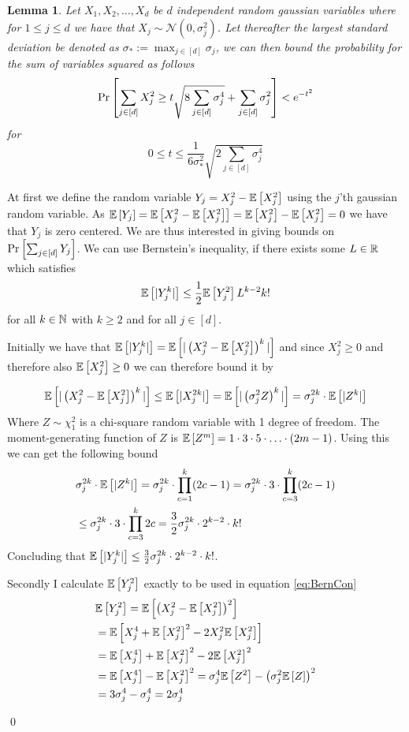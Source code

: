 \documentclass[a4paper,12pt]{article}
\renewenvironment{proof}{{\textit{Proof} \\}}{\qed}
\newtheorem{lemma}{Lemma}[section]
\begin{document}
\begin{lemma}
\label{lem:Bernstein}
Let $X_1, X_2, \dots , X_d$ be $d$ independent random gaussian variables 
where for $ 1 \le j \le d$ we have that $X_j \sim \mathcal{N}(0, \sigma_j^2)$.
Let thereafter the largest standard deviation be denoted as $\sigma_* := \max_{j \in [d]} \sigma_j$,
we can then bound the probability for the sum of variables squared as follows 
\[
\Pr\left [\sum_{j \in [d]} X_j^2  \ge 
    t \sqrt{8 \sum_{j \in [d]} \sigma_j^4} +
    \sum_{j \in [d]} \sigma_j^2  \right] < e^{-t^2}
\]
for
\[
0 \le t \le 
    \frac{1}{6 \sigma_*^2} \sqrt{2 \sum_{j \in [d]} \sigma_j^4}
\]
\end{lemma}
\begin{proof}
At first we define the random variable $Y_j = X_j^2 - \mathbb{E} \left [ X_j^2  \right]$ 
using the $j$'th gaussian random variable.
As $\mathbb{E} \left [ Y_j  \right] = \mathbb{E} \left [ X_j^2 - \mathbb{E} \left [ X_j^2  \right]  \right] = \mathbb{E} \left [ X_j^2  \right] - \mathbb{E} \left [ X_j^2  \right] = 0$ 
we have that $Y_j$ is zero centered. We are thus interested in giving bounds on
$\Pr\left [\sum_{j \in [d]} Y_j \right]$. 
We can use Bernstein's inequality, if there exists some $L \in \mathbb{R}$ which satisfies 
\begin{equation}
\label{eq:BernCon}
    \mathbb{E} \left [  |Y^k_j|   \right] \le \frac{1}{2} \mathbb{E} \left [ Y_j^2  \right] L^{k-2} k!
\end{equation}
for all $k \in \mathbb{N}$ with $k \ge 2$ and for all $j \in [d]$. \cite{wainwright_2019}

Initially we have that $\mathbb{E} \left [  |Y_j^k|   \right] = \mathbb{E} \left [  |\left (X_j^2 - \mathbb{E} \left [ X_j^2  \right]\right)^k|  \right]$
and since $X_j^2 \ge 0$ and therefore also $\mathbb{E} \left [ X_j^2  \right] \ge 0$ 
we can therefore bound it by

\[
    \mathbb{E} \left [  |\left (X_j^2 - \mathbb{E} \left [ X_j^2  \right]\right)^k|  \right] \le \mathbb{E} \left [  | X_j^{2k} |   \right] =
    \mathbb{E} \left [  | \left (\sigma_j^2 Z\right)^{k} |   \right] = 
    \sigma_j^{2k} \cdot \mathbb{E} \left [  |Z^{k} |   \right]
\]
Where $Z \sim \chi^2_1$ is a chi-square random variable with 1 degree of freedom.
The moment-generating function of $Z$ is 
$\mathbb{E} \left [ Z^m  \right] = 1 \cdot 3 \cdot 5 \cdot \ldots \cdot (2m - 1) $.
Using this we can get the following bound
\begin{align*}
    &\sigma_j^{2k} \cdot \mathbb{E} \left [  |Z^{k} |   \right] =
    \sigma_j^{2k} \cdot \prod_{c=1}^k(2c-1) =
    \sigma_j^{2k} \cdot 3\cdot \prod_{c=3}^k (2c-1) \\
    &\le \sigma_j^{2k} \cdot 3 \cdot \prod_{c=3}^k 2c
    = \frac{3}{2}\sigma_j^{2k} \cdot 2^{k-2} \cdot k!
\end{align*}
Concluding that $\mathbb{E} \left [  |Y_j^k|   \right] \le \frac{3}{2}\sigma_j^{2k} \cdot 2^{k-2} \cdot k!$.

\noindent Secondly I calculate $\mathbb{E} \left [ Y_j^2  \right]$ exactly to be used in equation \eqref{eq:BernCon}
\begin{align}
\label{eq:ExpY2:1}
    &\mathbb{E} \left [ Y_j^2  \right] = 
    \mathbb{E} \left [ \left (X_j^2 - \mathbb{E} \left [ X_j^2  \right]\right)^2  \right] \\
    &=\mathbb{E} \left [ X_j^4 + \mathbb{E} \left [ X_j^2  \right]^2 - 2X_j^2\mathbb{E} \left [ X_j^2  \right]  \right] \\
    &=\mathbb{E} \left [ X_j^4  \right] + \mathbb{E} \left [ X_j^2  \right]^2 - 2\mathbb{E} \left [ X_j^2  \right]^2 \\
    &=\mathbb{E} \left [ X_j^4  \right]  - \mathbb{E} \left [ X_j^2  \right]^2 =
    \sigma_j^4\mathbb{E} \left [ Z^2  \right]  - \left (\sigma_j^2\mathbb{E} \left [ Z  \right]\right)^2 \\
\label{eq:ExpY2:2}
    &=3\sigma_j^4  - \sigma_j^4 =
    2\sigma_j^4
\end{align}


\end{proof}
\end{document}
